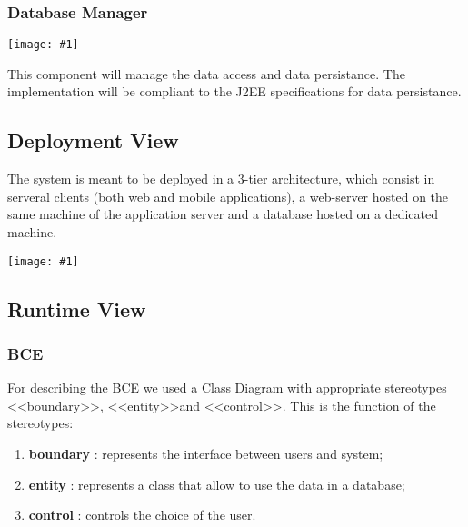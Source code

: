 \documentclass[11pt, a4paper,titlepage]{article}
\newcommand{\image}[1]{
	\begin{center}
		\noindent \texttt{[image: \#1]}
	\end{center}
	}
\begin{document}
 \subsubsection{Database Manager} 
	\image{diagram_class_database.png}
 This component will manage the data access and data persistance. The implementation will be compliant to the J2EE specifications for data persistance.
	
\subsection{Deployment View}
The system is meant to be deployed in a 3-tier architecture, which consist in serveral clients (both web and mobile applications), a web-server hosted on the same machine of the application server and a database hosted on a dedicated machine.
\image{diagram_deployment.png}


\subsection{Runtime View}
\subsubsection{BCE}
For describing the BCE we used a Class Diagram with appropriate stereotypes \textless \textless boundary\textgreater \textgreater , \textless \textless entity\textgreater \textgreater  and \textless \textless control\textgreater \textgreater .
This is the function of the stereotypes:
\begin{enumerate}
	\item 	\textbf{boundary} : represents the interface between users and system;
	\item 	\textbf{entity} : represents a class that allow to use the data in a database;
	\item 	\textbf{control} : controls the choice of the user.
\end{enumerate}
\end{document}
